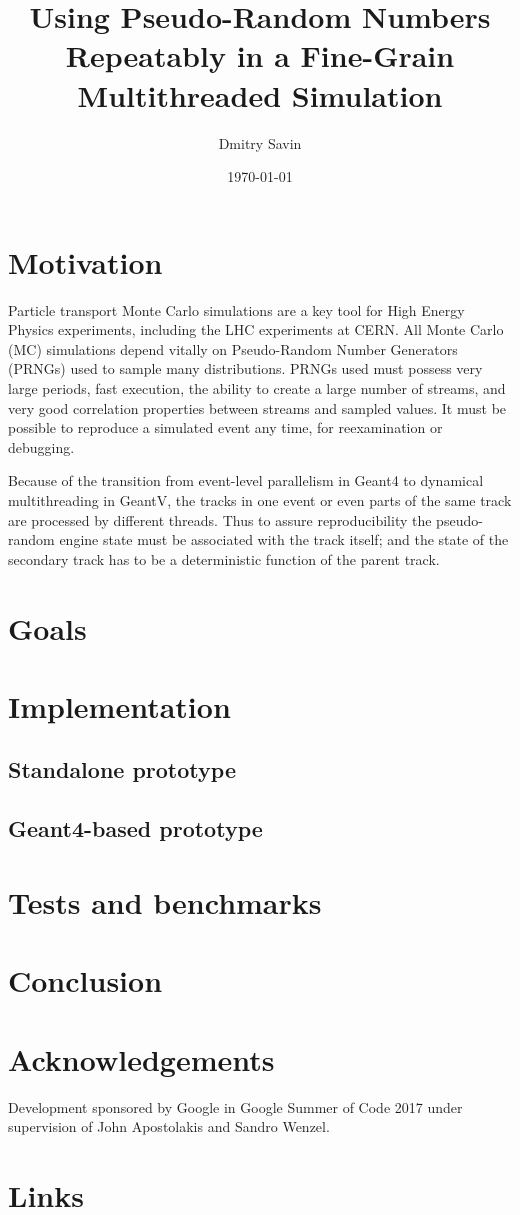 \documentclass[a4paper, 12pt]{article} %
\title{Using Pseudo-Random Numbers Repeatably in a Fine-Grain Multithreaded Simulation}
\author{Dmitry Savin}
\date{\today}
\begin{document}
 \maketitle

 \section*{Motivation}
  Particle transport Monte Carlo simulations are a key tool for High Energy Physics experiments, including the LHC experiments at CERN.
  All Monte Carlo (MC) simulations depend vitally on Pseudo-Random Number Generators (PRNGs) used to sample many distributions.
  PRNGs used must possess very large periods, fast execution, the ability to create a large number of streams, and very good correlation properties between streams and sampled values. It must be possible to reproduce a simulated event any time, for reexamination or debugging.

  Because of the transition from event-level parallelism in Geant4 to dynamical multithreading in GeantV, the tracks in one event or even parts of the same track are processed by different threads.
  Thus to assure reproducibility the pseudo-random engine state must be associated with the track itself;
  and the state of the secondary track has to be a deterministic function of the parent track.
 \section*{Goals}
  
 \section*{Implementation}
 
  \subsection*{Standalone prototype}
 
  \subsection*{Geant4-based prototype}
  
 \section*{Tests and benchmarks}
 
 \section*{Conclusion}
 
 \section*{Acknowledgements}
  Development sponsored by Google in Google Summer of Code 2017 under supervision of John Apostolakis and Sandro Wenzel.
 
 \section*{Links}
 
%  
%  
 
\end{document}
